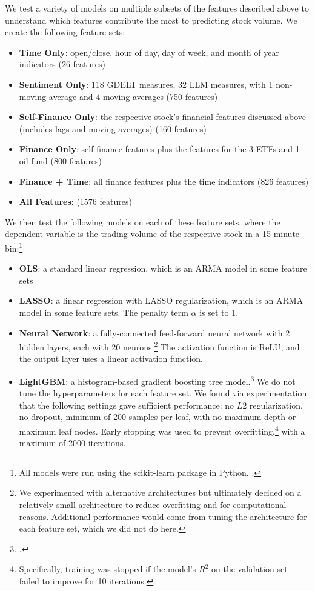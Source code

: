 \documentclass[12pt]{article}
\begin{document}
We test a variety of models on multiple subsets of the features described above to understand which features contribute the most to predicting stock volume. We create the following feature sets:
\begin{itemize}
\singlespacing
    \item \textbf{Time Only}: open/close, hour of day, day of week, and month of year indicators (26 features)
    \item \textbf{Sentiment Only}: 118 GDELT measures, 32 LLM measures, with 1 non-moving average and 4 moving averages (750 features)
    \item \textbf{Self-Finance Only}: the respective stock's financial features discussed above (includes lags and moving averages) (160 features)
    \item \textbf{Finance Only}: self-finance features plus the features for the 3 ETFs and 1 oil fund (800 features)
    \item \textbf{Finance + Time}: all finance features plus the time indicators (826 features)
    \item \textbf{All Features}: (1576 features)
\end{itemize}
We then test the following models on each of these feature sets, where the dependent variable is the trading volume of the respective stock in a 15-minute bin:\footnote{All models were run using the \textsf{scikit-learn} package in Python. \textcite{scikit-learn}.}
\begin{itemize}
\singlespacing
    \item \textbf{OLS}: a standard linear regression, which is an ARMA model in some feature sets
    \item \textbf{LASSO}: a linear regression with LASSO regularization, which is an ARMA model in some feature sets. The penalty term $\alpha$ is set to 1.
    \item \textbf{Neural Network}: a fully-connected feed-forward neural network with 2 hidden layers, each with 20 neurons.\footnote{We experimented with alternative architectures but ultimately decided on a relatively small architecture to reduce overfitting and for computational reasons. Additional performance would come from tuning the architecture for each feature set, which we did not do here.} The activation function is ReLU, and the output layer uses a linear activation function.
    \item \textbf{LightGBM}: a histogram-based gradient boosting tree model.\footnote{\textcite{ke2017lightgbm}.} We do not tune the hyperparameters for each feature set. We found via experimentation that the following settings gave sufficient performance: no $L2$ regularization, no dropout, minimum of 200 samples per leaf, with no maximum depth or maximum leaf nodes. Early stopping was used to prevent overfitting,\footnote{Specifically, training was stopped if the model's $R^2$ on the validation set failed to improve for 10 iterations.} with a maximum of 2000 iterations.
\end{itemize}
\end{document}

